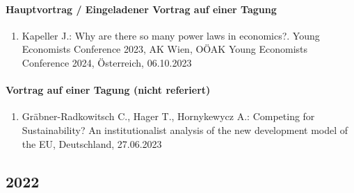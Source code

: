 \paragraph{Hauptvortrag / Eingeladener Vortrag auf einer Tagung}
\begin{enumerate}
	\item Kapeller J.: Why are there so many power laws in economics?. Young Economists Conference 2023, AK Wien, OÖAK Young Economists Conference 2024, Österreich, 06.10.2023
\end{enumerate}
\paragraph{Vortrag auf einer Tagung (nicht referiert)}
\begin{enumerate}
	\item Gräbner-Radkowitsch C., Hager T., Hornykewycz A.: Competing for Sustainability? An institutionalist analysis of the new development model of the EU, Deutschland, 27.06.2023
\end{enumerate}
\subsection*{2022}

